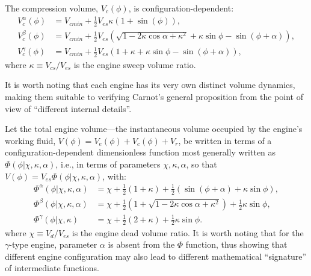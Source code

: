     The compression volume, $V_c(\phi)$, is configuration-dependent:
    \begin{align}
        \label{eq:Vca}
        V^{\alpha}_c(\phi) &= V_{cmin} + \frac{1}{2} V_{es} \kappa (1 + \sin(\phi)), \\
        \label{eq:Vcb}
        V^{\beta}_c(\phi)  &= V_{cmin} + \frac{1}{2} V_{es} (\sqrt{1 - 2\kappa\cos\alpha + \kappa^2} + \kappa\sin\phi - \sin(\phi + \alpha)), \\
        \label{eq:Vcg}
        V^{\gamma}_c(\phi) &= V_{cmin} + \frac{1}{2} V_{es} (1 + \kappa + \kappa\sin\phi - \sin(\phi + \alpha)),
    \end{align}
    \noindent where $\kappa \equiv V_{cs}/V_{es}$ is the engine sweep volume ratio.

    It is worth noting that each engine has its very own distinct volume dynamics,  making  them
    suitable to verifying Carnot's general proposition from the point  of  view  of  ``different
    internal details''.

    Let the total engine volume---the instantaneous volume  occupied  by  the  engine's  working
    fluid,  $V(\phi)  =  V_e(\phi)  +  V_c(\phi)  +   V_r$,   be   written   in   terms   of   a
    configuration-dependent dimensionless function most generally written as $\Phi(\phi |  \chi,
    \kappa, \alpha)$, i.e., in terms of parameters $\chi, \kappa, \alpha$, so  that  $V(\phi)  =
    V_{es}\Phi(\phi | \chi, \kappa, \alpha)$, with:
    \begin{align}
        \label{eq:Phia}
        \Phi^{\alpha}(\phi | \chi, \kappa, \alpha)  &= \chi + \frac{1}{2}(1 + \kappa) + \frac{1}{2}(\sin(\phi + \alpha) + \kappa\sin\phi),\\
        \label{eq:Phib}
        \Phi^{\beta}(\phi | \chi, \kappa, \alpha)   &= \chi + \frac{1}{2}(1 + \sqrt{1 - 2\kappa\cos\alpha + \kappa^2}) + \frac{1}{2}\kappa\sin\phi,\\
        \label{eq:Phig}
        \Phi^{\gamma}(\phi | \chi, \kappa)          &= \chi + \frac{1}{2}(2 + \kappa) + \frac{1}{2}\kappa\sin\phi.
    \end{align}
    \noindent where $\chi \equiv V_{d}/V_{es}$ is the engine dead  volume  ratio.  It  is  worth
    noting that for the $\gamma$-type engine, parameter  $\alpha$  is  absent  from  the  $\Phi$
    function, thus showing that different  engine  configuration  may  also  lead  to  different
    mathematical ``signature'' of intermediate functions.

